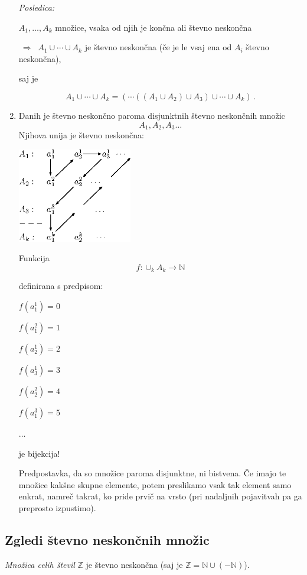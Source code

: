 \documentclass[11pt,paper=b5,footinclude,headinclude]{scrbook} %
\def\sledi {{~\Rightarrow~}}
\begin{document}
\begin{enumerate}[(1.)]
\medskip
{\em Posledica:}

$A_1,\ldots, A_k$ množice, vsaka od njih je končna ali števno neskončna

$\sledi$ $A_1\cup\cdots\cup A_k$ je števno neskončna (če je le vsaj ena od $A_i$ števno neskončna),

saj je

$$A_1\cup\cdots\cup A_k = (\cdots ((A_1\cup A_2)\cup A_3)\cup\cdots \cup A_k)\,.$$
%

\item Danih je števno neskončno paroma disjunktnih števno neskončnih množic
$$A_1, A_2,A_3\ldots$$
Njihova unija je števno neskončna:
\begin{center}
\includegraphics[width=50mm]{stevnonesk.eps}
\end{center}

Funkcija
$$f:\cup_{k}A_k\to \mathbb{N}$$

definirana s predpisom:

$f(a_1^1) = 0$

$f(a_1^2) = 1$

$f(a_2^1) = 2$

$f(a_3^1) = 3$

$f(a_2^2) = 4$

$f(a_1^3) = 5$

$\ldots$

je bijekcija!

Predpostavka, da so množice paroma disjunktne, ni bistvena. Če imajo te množice kakšne skupne elemente, potem preslikamo vsak tak element samo enkrat, namreč takrat, ko pride prvič na vrsto (pri nadaljnih pojavitvah pa ga preprosto izpustimo).
\end{enumerate}

\subsection{Zgledi števno neskončnih množic}

\bigskip
{\em Množica celih števil} $\mathbb{Z}$ je števno neskončna (saj je $\mathbb{Z} = \mathbb{N}\cup (-\mathbb{N})$).
\end{document}
